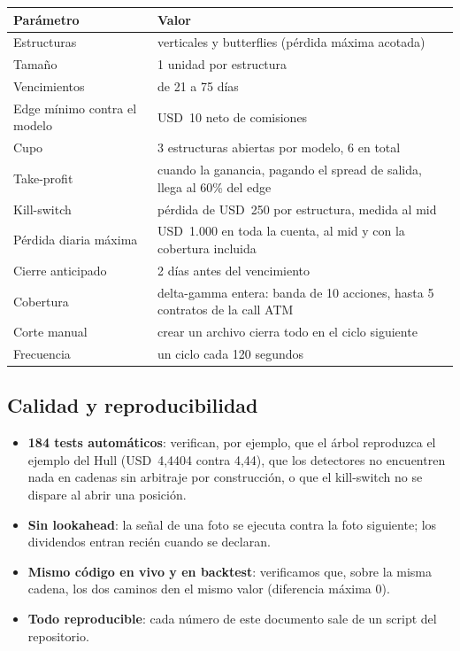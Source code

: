 \documentclass[11pt,a4paper]{article}
\newcommand{\code}[1]{\texttt{\detokenize{#1}}}
\newcommand{\usd}[1]{USD~#1}
\begin{document}
\begin{center}
\small
\begin{tabularx}{0.86\linewidth}{@{}>{\sffamily}lX@{}}
\toprule
\textbf{Parámetro} & \textbf{Valor} \\
\midrule
Estructuras & verticales y butterflies (pérdida máxima acotada) \\
Tamaño & 1 unidad por estructura \\
Vencimientos & de 21 a 75 días \\
Edge mínimo contra el modelo & \usd{10} neto de comisiones \\
Cupo & 3 estructuras abiertas por modelo, 6 en total \\
Take-profit & cuando la ganancia, pagando el spread de salida, llega al 60\% del edge \\
Kill-switch & pérdida de \usd{250} por estructura, medida al mid \\
Pérdida diaria máxima & \usd{1.000} en toda la cuenta, al mid y con la cobertura incluida \\
Cierre anticipado & 2 días antes del vencimiento \\
Cobertura & delta-gamma entera: banda de 10 acciones, hasta 5 contratos de la call ATM \\
Corte manual & crear un archivo \code{KILL} cierra todo en el ciclo siguiente \\
Frecuencia & un ciclo cada 120 segundos \\
\bottomrule
\end{tabularx}
\end{center}

\subsection{Calidad y reproducibilidad}

\begin{itemize}
\item \textbf{184 tests automáticos}: verifican, por ejemplo, que el árbol reproduzca el ejemplo del Hull
  (\usd{4,4404} contra 4,44), que los detectores no encuentren nada en cadenas sin arbitraje por construcción, o que
  el kill-switch no se dispare al abrir una posición.
\item \textbf{Sin lookahead}: la señal de una foto se ejecuta contra la foto siguiente; los dividendos entran recién
  cuando se declaran.
\item \textbf{Mismo código en vivo y en backtest}: verificamos que, sobre la misma cadena, los dos caminos den el
  mismo valor (diferencia máxima 0).
\item \textbf{Todo reproducible}: cada número de este documento sale de un script del repositorio.
\end{itemize}
\end{document}
